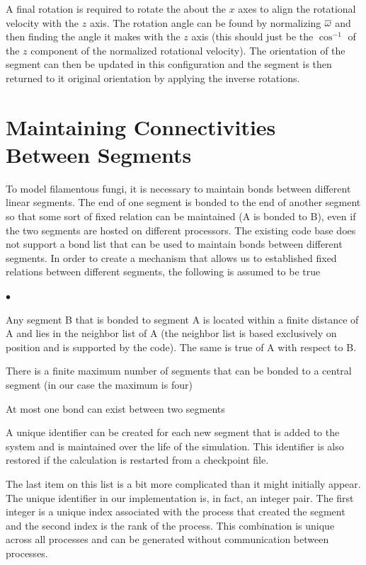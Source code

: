 \documentclass[12pt]{article}
\begin{document}
A final rotation is required to rotate the about the $x$ axes to align the rotational
velocity with the $z$ axis. The rotation angle can be found by normalizing $\overline{\omega}$
and then finding the angle it makes with the $z$ axis (this should just be the
$\cos^{-1}$ of the $z$ component of the normalized rotational velocity). The
orientation of the segment can then be updated in this configuration and the segment
is then returned to it original orientation by applying the inverse rotations.

\section{Maintaining Connectivities Between Segments}
To model filamentous fungi, it is necessary to maintain bonds between
different linear segments. The end of one segment is bonded to the end of another
segment so that some sort of fixed relation can be maintained (A is bonded to B),
even if the two segments are hosted on different processors. The existing code
base does not support a bond list that can be used to maintain bonds
between different segments. In order to create a mechanism that allows us to
established fixed relations between different segments, the following is assumed
to be true
\begin{list}{$\bullet$}{}
\item Any segment B that is bonded to segment A is located within a finite
distance of A and lies in the neighbor list of A (the neighbor list is based
exclusively on position and is supported by the code). The same is true of A with
respect to B.
\item There is a finite maximum number of segments that can be bonded to a
central segment (in our case the maximum is four)
\item At most one bond can exist between two segments
\item A unique identifier can be created for each new segment that is added to the
system and is maintained over the life of the simulation. This identifier is also
restored if the calculation is restarted from a checkpoint file.
\end{list}
The last item on this list is a bit more complicated than it might initially appear.
The unique identifier in our implementation is, in fact, an integer pair. The first
integer is a unique index associated with the process that created the segment and
the second index is the rank of the process. This combination is unique across all
processes and can be generated without communication between processes.
\end{document}
